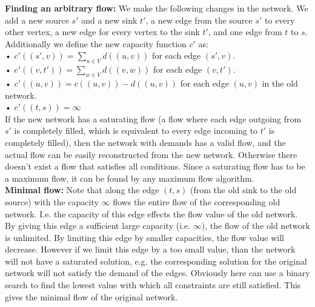 \textbf{Finding an arbitrary flow:} We make the following changes in the network. We add a new source $s'$
and a new sink $t'$, a new edge from the source $s'$ to every other
vertex, a new edge for every vertex to the sink $t'$, and one edge
from $t$ to $s$. Additionally we define the new capacity function
$c'$ as: \\
• $c'((s', v)) = \sum_{u \in V} d((u, v))$ for each edge $(s', v)$. \\
• $c'((v, t')) = \sum_{w \in V} d((v, w))$ for each edge $(v, t')$. \\
• $c'((u, v)) = c((u, v)) - d((u, v))$ for each edge $(u, v)$ in the
  old network. \\
• $c'((t, s)) = \infty$ \\

If the new network has a saturating flow (a flow where each edge
outgoing from $s'$ is completely filled, which is equivalent to every
edge incoming to $t'$ is completely filled), then the network with
demands has a valid flow, and the actual flow can be easily
reconstructed from the new network. Otherwise there doesn't exist a flow
that satisfies all conditions. Since a saturating flow has to be a
maximum flow, it can be found by any maximum flow algorithm. \\

\textbf{Minimal flow:}
Note that along the edge $(t, s)$ (from the old sink to the old
source) with the capacity $\infty$ flows the entire flow of the
corresponding old network. I.e. the capacity of this edge effects the
flow value of the old network. By giving this edge a sufficient large
capacity (i.e. $\infty$), the flow of the old network is unlimited. By
limiting this edge by smaller capacities, the flow value will decrease.
However if we limit this edge by a too small value, than the network
will not have a saturated solution, e.g. the corresponding solution for
the original network will not satisfy the demand of the edges. Obviously
here can use a binary search to find the lowest value with which all
constraints are still satisfied. This gives the minimal flow of the
original network.